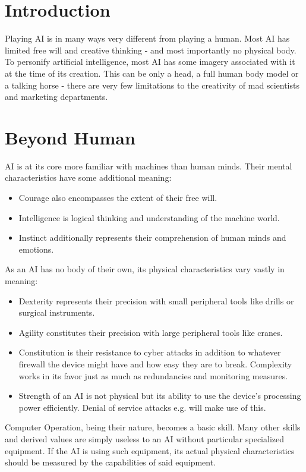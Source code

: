\documentclass[12pt,a4paper,openany]{book}
\begin{document}
	

	\chapter{Introduction}
	Playing AI is in many ways very different from playing a human. Most AI has limited free will and creative thinking - and most importantly no physical body. To personify artificial intelligence, most AI has some imagery associated with it at the time of its creation. This can be only a head, a full human body model or a talking horse - there are very few limitations to the creativity of mad scientists and marketing departments.

	\chapter{Beyond Human}
	AI is at its core more familiar with machines than human minds. Their mental characteristics have some additional meaning:
	\begin{itemize}
		\item Courage also encompasses the extent of their free will.
		\item Intelligence is logical thinking and understanding of the machine world.
		\item Instinct additionally represents their comprehension of human minds and emotions.
	\end{itemize}

	As an AI has no body of their own, its physical characteristics vary vastly in meaning:
	\begin{itemize}
		\item Dexterity represents their precision with small peripheral tools like drills or surgical instruments.
		\item Agility constitutes their precision with large peripheral tools like cranes.
		\item Constitution is their resistance to cyber attacks in addition to whatever firewall the device might have and how easy they are to break. Complexity works in its favor just as much as redundancies and monitoring measures.
		\item Strength of an AI is not physical but its ability to use the device’s processing power efficiently. Denial of service attacks e.g. will make use of this.
	\end{itemize}

	Computer Operation, being their nature, becomes a basic skill. Many other skills and derived values are simply useless to an AI without particular specialized equipment. If the AI is using such equipment, its actual physical characteristics should be measured by the capabilities of said equipment.
\end{document}
